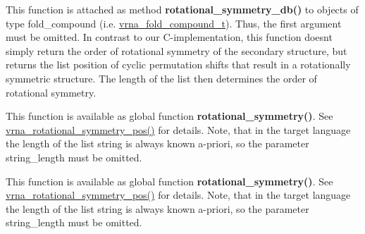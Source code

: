 \begin{DoxyRefList}
\item[\label{wrappers__wrappers000009}%
\Hypertarget{wrappers__wrappers000009}%
Global \hyperlink{group__combinatorics__utils_ga2a4227ebe28dbc7ad55444a3a1bf7119}{vrna\+\_\+rotational\+\_\+symmetry\+\_\+db\+\_\+pos} (vrna\+\_\+fold\+\_\+compound\+\_\+t $\ast$fc, const char $\ast$structure, unsigned int $\ast$$\ast$positions)]This function is attached as method {\bfseries rotational\+\_\+symmetry\+\_\+db()} to objects of type {\ttfamily fold\+\_\+compound} (i.\+e. \hyperlink{group__fold__compound_ga1b0cef17fd40466cef5968eaeeff6166}{vrna\+\_\+fold\+\_\+compound\+\_\+t}). Thus, the first argument must be omitted. In contrast to our C-\/implementation, this function doesn\textquotesingle{}t simply return the order of rotational symmetry of the secondary structure, but returns the list {\ttfamily position} of cyclic permutation shifts that result in a rotationally symmetric structure. The length of the list then determines the order of rotational symmetry.  
\item[\label{wrappers__wrappers000004}%
\Hypertarget{wrappers__wrappers000004}%
Global \hyperlink{group__combinatorics__utils_gac51464b5281833a58c25f9447252c495}{vrna\+\_\+rotational\+\_\+symmetry\+\_\+num} (const unsigned int $\ast$string, size\+\_\+t string\+\_\+length)]This function is available as global function {\bfseries rotational\+\_\+symmetry()}. See \hyperlink{group__combinatorics__utils_ga294d48935fcac87ab335d771fe289ecb}{vrna\+\_\+rotational\+\_\+symmetry\+\_\+pos()} for details. Note, that in the target language the length of the list {\ttfamily string} is always known a-\/priori, so the parameter {\ttfamily string\+\_\+length} must be omitted.  
\item[\label{wrappers__wrappers000005}%
\Hypertarget{wrappers__wrappers000005}%
Global \hyperlink{group__combinatorics__utils_ga95b5a6ac35da982e2a766f8d2f98a2e1}{vrna\+\_\+rotational\+\_\+symmetry\+\_\+pos\+\_\+num} (const unsigned int $\ast$string, size\+\_\+t string\+\_\+length, unsigned int $\ast$$\ast$positions)]This function is available as global function {\bfseries rotational\+\_\+symmetry()}. See \hyperlink{group__combinatorics__utils_ga294d48935fcac87ab335d771fe289ecb}{vrna\+\_\+rotational\+\_\+symmetry\+\_\+pos()} for details. Note, that in the target language the length of the list {\ttfamily string} is always known a-\/priori, so the parameter {\ttfamily string\+\_\+length} must be omitted.  
\item[\label{wrappers__wrappers000024}%
\Hypertarget{wrappers__wrappers000024}%
Global \hyperlink{group__soft__constraints_gaf162aedac7422f2eb16ea030f47d2f4b}{vrna\+\_\+sc\+\_\+add\+\_\+bp} (vrna\+\_\+fold\+\_\+compound\+\_\+t $\ast$vc, int i, int j, F\+L\+T\+\_\+\+O\+R\+\_\+\+D\+BL energy, unsigned int options)]


\end{DoxyRefList}

